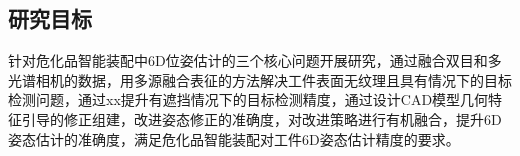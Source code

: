 \documentclass[12pt]{article}
\begin{document}



\fi 

{


}



\subsection{研究目标}
针对危化品智能装配中6D位姿估计的三个核心问题开展研究，通过融合双目和多光谱相机的数据，用多源融合表征的方法解决工件表面无纹理且具有情况下的目标检测问题，通过xx提升有遮挡情况下的目标检测精度，通过设计CAD模型几何特征引导的修正组建，改进姿态修正的准确度，对改进策略进行有机融合，提升6D姿态估计的准确度，满足危化品智能装配对工件6D姿态估计精度的要求。
\end{document}
